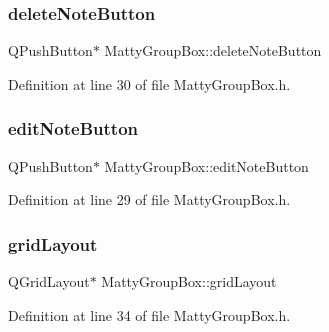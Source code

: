\subsubsection{\texorpdfstring{delete\+Note\+Button}{deleteNoteButton}}
{\footnotesize\ttfamily Q\+Push\+Button$\ast$ Matty\+Group\+Box\+::delete\+Note\+Button\hspace{0.3cm}{\ttfamily [private]}}



Definition at line 30 of file Matty\+Group\+Box.\+h.

\hypertarget{classMattyGroupBox_a3237eef2287c1b2fcff14d226ef9116d}{}\label{classMattyGroupBox_a3237eef2287c1b2fcff14d226ef9116d} 
\subsubsection{\texorpdfstring{edit\+Note\+Button}{editNoteButton}}
{\footnotesize\ttfamily Q\+Push\+Button$\ast$ Matty\+Group\+Box\+::edit\+Note\+Button\hspace{0.3cm}{\ttfamily [private]}}



Definition at line 29 of file Matty\+Group\+Box.\+h.

\hypertarget{classMattyGroupBox_a02436c3690d2007eb0cba523bcb668ea}{}\label{classMattyGroupBox_a02436c3690d2007eb0cba523bcb668ea} 
\subsubsection{\texorpdfstring{grid\+Layout}{gridLayout}}
{\footnotesize\ttfamily Q\+Grid\+Layout$\ast$ Matty\+Group\+Box\+::grid\+Layout\hspace{0.3cm}{\ttfamily [private]}}



Definition at line 34 of file Matty\+Group\+Box.\+h.

\hypertarget{classMattyGroupBox_a5d52dd2e01ba1a5d155e056ea438f142}{}\label{classMattyGroupBox_a5d52dd2e01ba1a5d155e056ea438f142} 
